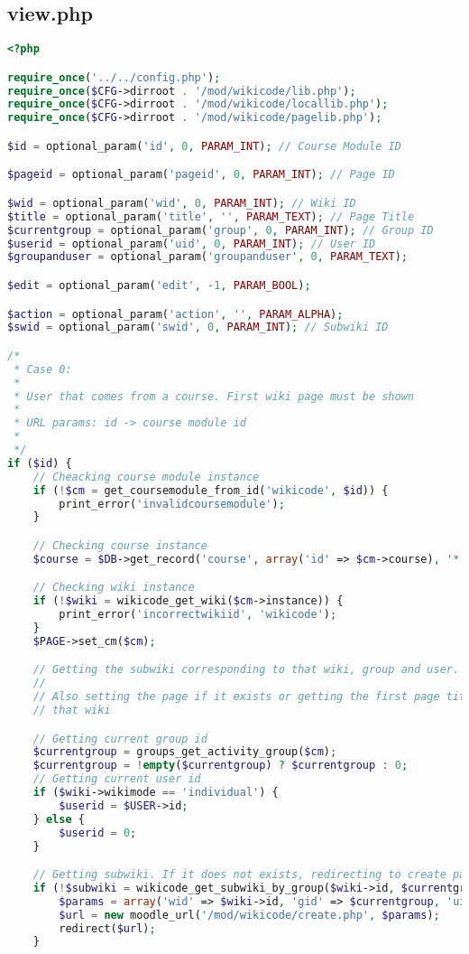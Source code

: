 \subsection{view.php}
\begin{lstlisting}[language=PHP]
<?php

require_once('../../config.php');
require_once($CFG->dirroot . '/mod/wikicode/lib.php');
require_once($CFG->dirroot . '/mod/wikicode/locallib.php');
require_once($CFG->dirroot . '/mod/wikicode/pagelib.php');

$id = optional_param('id', 0, PARAM_INT); // Course Module ID

$pageid = optional_param('pageid', 0, PARAM_INT); // Page ID

$wid = optional_param('wid', 0, PARAM_INT); // Wiki ID
$title = optional_param('title', '', PARAM_TEXT); // Page Title
$currentgroup = optional_param('group', 0, PARAM_INT); // Group ID
$userid = optional_param('uid', 0, PARAM_INT); // User ID
$groupanduser = optional_param('groupanduser', 0, PARAM_TEXT);

$edit = optional_param('edit', -1, PARAM_BOOL);

$action = optional_param('action', '', PARAM_ALPHA);
$swid = optional_param('swid', 0, PARAM_INT); // Subwiki ID

/*
 * Case 0:
 *
 * User that comes from a course. First wiki page must be shown
 *
 * URL params: id -> course module id
 *
 */
if ($id) {
    // Cheacking course module instance
    if (!$cm = get_coursemodule_from_id('wikicode', $id)) {
        print_error('invalidcoursemodule');
    }

    // Checking course instance
    $course = $DB->get_record('course', array('id' => $cm->course), '*', MUST_EXIST);

    // Checking wiki instance
    if (!$wiki = wikicode_get_wiki($cm->instance)) {
        print_error('incorrectwikiid', 'wikicode');
    }
    $PAGE->set_cm($cm);

    // Getting the subwiki corresponding to that wiki, group and user.
    //
    // Also setting the page if it exists or getting the first page title form
    // that wiki

    // Getting current group id
    $currentgroup = groups_get_activity_group($cm);
    $currentgroup = !empty($currentgroup) ? $currentgroup : 0;
    // Getting current user id
    if ($wiki->wikimode == 'individual') {
        $userid = $USER->id;
    } else {
        $userid = 0;
    }

    // Getting subwiki. If it does not exists, redirecting to create page
    if (!$subwiki = wikicode_get_subwiki_by_group($wiki->id, $currentgroup, $userid)) {
        $params = array('wid' => $wiki->id, 'gid' => $currentgroup, 'uid' => $userid, 'title' => $wiki->firstpagetitle);
        $url = new moodle_url('/mod/wikicode/create.php', $params);
        redirect($url);
    }


\end{lstlisting}

